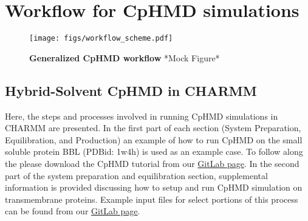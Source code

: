 \documentclass[9pt,tutorial]{livecoms}
\begin{document}



\section{Workflow for CpHMD simulations} %


\begin{figure*}
    \centering
    \texttt{[image: figs/workflow\_scheme.pdf]}
    \caption{\textbf{Generalized CpHMD workflow} 
    *Mock Figure*  
    }
    \label{fig:intro}
\end{figure*}

\subsection{Hybrid-Solvent CpHMD in CHARMM} %

Here, the steps and processes involved in running CpHMD simulations in CHARMM are presented. 
In the first part of each section (System Preparation, Equilibration, and Production) an example of how to run CpHMD on the small soluble protein BBL (PDBid: 1w4h)\cite{Ferguson_JMolBiol_2005_v353_p427} is used as an example case. 
To follow along the please download the CpHMD tutorial from our \href{https://gitlab.com/shenlab-amber-cphmd/cphmd-tutorial/-/tree/main/pH-REX_CpHMD_BBL_tutorial_in_CHARMM}{GitLab page}.
In the second part of the system preparation and equilibration section, supplemental information is provided discussing how to setup and run CpHMD simulation on transmembrane proteins.
Example input files for select portions of this process can be found from our \href{https://gitlab.com/shenlab-amber-cphmd/cphmd-tutorial/-/tree/main/MEMB_pH-REX_CpHMD_CHARMM_Examples}{GitLab page}.
\end{document}
